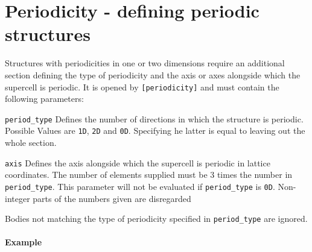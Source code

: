 \section{Periodicity - defining periodic structures}
Structures with periodicities in one or two dimensions require an additional section defining the type of periodicity and the axis or axes alongside which the supercell is periodic. It is opened by \lstinline{[periodicity]} and must contain the following parameters:
\begin{description}
 \item{\lstinline{period_type}} Defines the number of directions in which the structure is periodic. Possible Values are \lstinline{1D}, \lstinline{2D} and \lstinline{0D}. Specifying he latter is equal to leaving out the whole section.
 \item{\lstinline{axis}} Defines the axis alongside which the supercell is periodic in lattice coordinates. The number of elements supplied must be 3 times the number in \lstinline{period_type}. This parameter will not be evaluated if \lstinline{period_type} is \lstinline{0D}. Non-integer parts of the numbers given are disregarded
\end{description}

Bodies not matching the type of periodicity specified in \lstinline{period_type} are ignored.

\paragraph{Example}\ 


